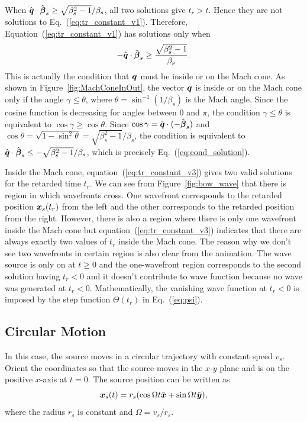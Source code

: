 \documentclass[12pt]{article}
\newcommand \beq {\begin{equation}}
\newcommand \eeq {\end{equation}}
\newcommand{\ve}[1]{\mbox{\boldmath $#1$}}
\begin{document}
When $\hat{\ve{q}}\cdot \hat{\ve{\beta}}_s \geq \sqrt{\beta_s^2-1}/\beta_s$, all two 
solutions give $t_r>t$. Hence they are not solutions to Eq.~(\ref{eq:tr_constant_v1}). 
Therefore, Equation~(\ref{eq:tr_constant_v1}) has solutions only when 
\beq
  -\hat{\ve{q}}\cdot \hat{\ve{\beta}}_s \geq \frac{\sqrt{\beta_s^2-1}}{\beta_s} .
\label{eq:cond_solution}
\eeq
This is actually the condition that $\ve{q}$ must be inside or on the Mach cone. 
As shown in Figure~\ref{fig:MachConeInOut}, the vector $\ve{q}$ is inside or on 
the Mach cone only if the angle $\gamma \leq \theta$, where $\theta=\sin^{-1} (1/\beta_s)$ 
is the Mach angle. Since the cosine function is decreasing for angles between 0 and $\pi$, 
the condition $\gamma \leq \theta$ is equivalent to $\cos \gamma \geq \cos \theta$. Since 
$\cos \gamma = \hat{\ve{q}} \cdot (-\hat{\ve{\beta}}_s)$ and $\cos \theta = \sqrt{1-\sin^2 \theta}=
\sqrt{\beta_s^2-1}/\beta_s$, the condition is equivalent to 
$\hat{\ve{q}}\cdot \hat{\ve{\beta}}_s \leq -\sqrt{\beta_s^2-1}/\beta_s$, which is precisely 
Eq.~(\ref{eq:cond_solution}). 

Inside the Mach cone, equation~(\ref{eq:tr_constant_v3}) gives two valid solutions 
for the retarded time $t_r$. We can see from Figure~\ref{fig:bow_wave} that there is 
region in which wavefronts cross. One wavefront corresponds to the retarded position 
$\ve{x}_s(t_r)$ from the left and the other corresponds to the retarded position 
from the right. However, there is also a region where there is only one wavefront 
inside the Mach cone but equation~(\ref{eq:tr_constant_v3}) indicates that there are 
always exactly two values of $t_r$ inside the Mach cone. The reason why we don't see 
two wavefronts in certain region is also clear from the animation. The wave source 
is only on at $t \geq 0$ and the one-wavefront region corresponds to the second 
solution having $t_r<0$ and it doesn't contribute to wave function because no 
wave was generated at $t_r<0$. Mathematically, the vanishing wave function 
at $t_r<0$ is imposed by the step function $\Theta(t_r)$ in Eq.~(\ref{eq:psi}). 

\subsection{Circular Motion}

In this case, the source moves in a circular trajectory with constant speed $v_s$. 
Orient the coordinates so that the source moves in the $x$-$y$ plane and is on the 
positive $x$-axis at $t=0$. The source position can be written as 
\beq
  \ve{x}_s(t) = r_s(\cos \Omega t \hat{\ve{x}} + \sin \Omega t \hat{\ve{y}}) ,
\eeq
where the radius $r_s$ is constant and $\Omega=v_s/r_s$.
\end{document}
